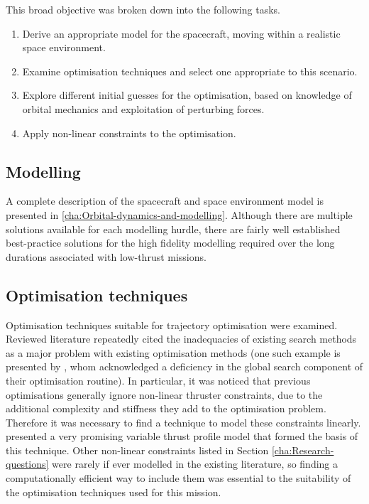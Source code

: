 This broad objective was broken down into the following tasks.

\begin{enumerate}
  \item Derive an appropriate model for the spacecraft, moving within a realistic space environment.
  \item Examine optimisation techniques and select one appropriate to this scenario.
  \item Explore different initial guesses for the optimisation, based on knowledge of orbital mechanics and exploitation of perturbing forces.
  \item Apply non-linear constraints to the optimisation.
\end{enumerate}

\subsection{Modelling} \label{sub:Modelling-task}

A complete description of the spacecraft and space environment model is presented in \autoref{cha:Orbital-dynamics-and-modelling}. Although there are multiple solutions available for each modelling hurdle, there are fairly well established best-practice solutions for the high fidelity modelling required over the long durations associated with low-thrust missions.

\subsection{Optimisation techniques} \label{sub:Optimisation-techniques}

Optimisation techniques suitable for trajectory optimisation were examined. Reviewed literature repeatedly cited the inadequacies of existing search methods as a major problem with existing optimisation methods (one such example is presented by \textcite{Petropoulos2007}, whom acknowledged a deficiency in the global search component of their optimisation routine). In particular, it was noticed that previous optimisations generally ignore non-linear thruster constraints, due to the additional complexity and stiffness they add to the optimisation problem. Therefore it was necessary to find a technique to model these constraints linearly. \textcite{Gao2008} presented a very promising variable thrust profile model that formed the basis of this technique. Other non-linear constraints listed in Section \ref{cha:Research-questions} were rarely if ever modelled in the existing literature, so finding a computationally efficient way to include them was essential to the suitability of the optimisation techniques used for this mission.
 
